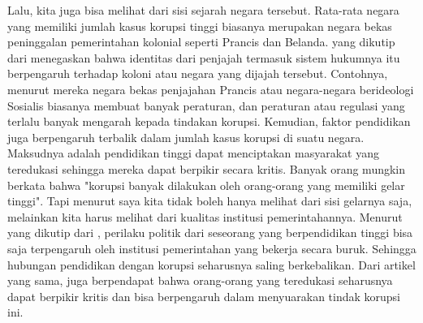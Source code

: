 \documentclass[11pt]{article}
\begin{document}
Lalu, kita juga bisa melihat dari sisi sejarah negara tersebut. Rata-rata negara
yang memiliki jumlah kasus korupsi tinggi biasanya merupakan negara bekas peninggalan
pemerintahan kolonial seperti Prancis dan Belanda. \citet*{laportaQualityGovernment1999}
yang dikutip dari \citet*{svenssonEightQuestionsCorruption2005} menegaskan bahwa 
identitas dari penjajah termasuk sistem hukumnya itu berpengaruh terhadap koloni 
atau negara yang dijajah tersebut. Contohnya, menurut mereka negara bekas penjajahan
Prancis atau negara-negara berideologi Sosialis biasanya membuat banyak peraturan,
dan peraturan atau regulasi yang terlalu banyak mengarah kepada tindakan korupsi. 
Kemudian, faktor pendidikan juga berpengaruh terbalik dalam jumlah kasus korupsi di suatu
negara. Maksudnya adalah pendidikan tinggi dapat menciptakan masyarakat yang
teredukasi sehingga mereka dapat berpikir secara kritis. Banyak orang mungkin berkata
bahwa "korupsi banyak dilakukan oleh orang-orang yang memiliki gelar tinggi". Tapi
menurut saya kita tidak boleh hanya melihat dari sisi gelarnya saja, melainkan 
kita harus melihat dari kualitas institusi pemerintahannya.
Menurut \citet*{vanderbrugErosionPoliticalTrust2007} yang dikutip dari 
\citet*{agerbergCurseKnowledgeEducation2019}, perilaku politik dari seseorang
yang berpendidikan tinggi bisa saja terpengaruh oleh institusi pemerintahan yang
bekerja secara buruk. Sehingga hubungan pendidikan dengan korupsi seharusnya
saling berkebalikan. Dari artikel yang sama, \citeauthor{agerbergCurseKnowledgeEducation2019}
juga berpendapat bahwa orang-orang yang teredukasi seharusnya dapat berpikir kritis 
dan bisa berpengaruh dalam menyuarakan tindak korupsi ini. 
\end{document}
